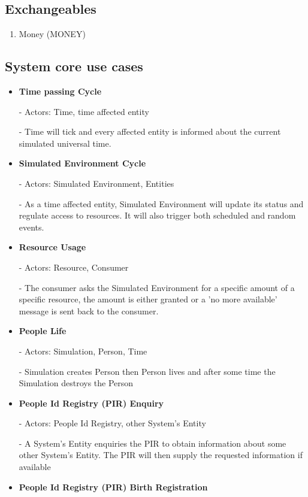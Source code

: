 \subsection{Exchangeables} 
\begin{enumerate}
\item Money (MONEY)
\end{enumerate}


\subsection{System core use cases}
\begin{itemize}
  \item \textbf{Time passing Cycle}  
	
	- Actors: Time, time affected entity

	- Time will tick and every affected entity is informed about the current simulated universal time.

  \item \textbf{Simulated Environment Cycle}

	- Actors: Simulated Environment, Entities

	- As a time affected entity, Simulated Environment will update its status and regulate access to resources. It will also trigger both scheduled and random events.

  \item \textbf{Resource Usage}

	- Actors: Resource, Consumer

	- The consumer asks the Simulated Environment for a specific amount of a specific resource, the amount is either granted or a 'no more available' message is sent back to the consumer.

  \item \textbf{People Life} 

	- Actors: Simulation, Person, Time

	- Simulation creates Person then Person lives and after some time the Simulation destroys the Person

  \item \textbf{People Id Registry (PIR) Enquiry}

	- Actors: People Id Registry, other System's Entity

	- A System's Entity enquiries the PIR to obtain information about some other System's Entity. The PIR will then supply the requested information  if available

  \item \textbf{People Id Registry (PIR) Birth Registration}


\end{itemize}
